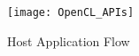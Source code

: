 \begin{figure}[h]
    \centering
    \texttt{[image: OpenCL\_APIs]}
    \caption{Host Application Flow}
    \label{fig:1_HOA}
\end{figure}